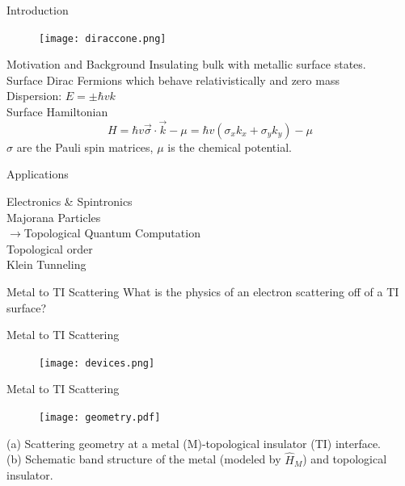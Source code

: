 \documentclass[]{beamer}
\begin{document}
\begin{frame}{Introduction}
\begin{figure}
\center
\texttt{[image: diraccone.png]}

\end{figure}
\end{frame}  


\begin{frame}{Motivation and Background}
Insulating bulk with metallic surface states.\\
Surface Dirac Fermions which behave relativistically and zero mass\\
Dispersion: $E=\pm\hbar v k$ \\

Surface Hamiltonian
\begin{equation*}
H=\hbar v \vec{\sigma}\cdot \vec{k}-\mu=\hbar v (\sigma_x k_x + \sigma_y k_y) - \mu
\end{equation*}
$\sigma$ are the Pauli spin matrices, $\mu$ is the chemical potential.
\end{frame}

\begin{frame}{Applications}

Electronics \& Spintronics\\
Majorana Particles\\
$\rightarrow$Topological Quantum Computation\\
Topological order\\
Klein Tunneling\\
\end{frame}


\begin{frame}{Metal to TI Scattering}
\Large What is the physics of an electron scattering off of a TI surface?
\end{frame}

\begin{frame}{Metal to TI Scattering}
\begin{figure}
\center
\texttt{[image: devices.png]}
\end{figure}
\end{frame}


\begin{frame}{Metal to TI Scattering}
\begin{figure}
\center
\texttt{[image: geometry.pdf]}
\end{figure}
(a) Scattering geometry at a metal (M)-topological insulator (TI) interface.\\
(b) Schematic band structure of the metal (modeled by $\hat{H}_M$) and topological insulator.
\end{frame}
\end{document}
